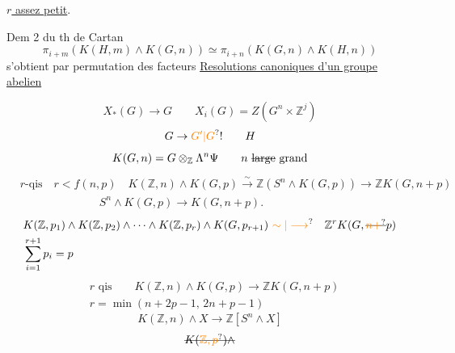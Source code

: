 \uline{$r$ assez petit}.

Dem 2 du th de Cartan
\[
\pi_{i+m}(K(H,m)\wedge K(G,n))\simeq\pi_{i+n}(K(G,n)\wedge K(H,n))
\]
s'obtient par permutation des facteurs
\uline{Resolutions canoniques d'un groupe abelien}

\[
X_*(G)\longrightarrow G\qquad X_i(G)=Z(G^n\times\mathbb Z^j)
\]
\[
G\to \unsure{G'|G}!\qquad H
\]
\[
K(G,n)=G\otimes_{\mathbb Z}\Lambda^n\Psi\qquad n\ \deleted{\text{large}}\ \text{grand}
\]
\[
\begin{aligned}
&r\text{-qis}\quad r<f(n,p)\quad K(\mathbb Z,n)\wedge K(G,p)\xrightarrow{\sim}\mathbb Z(S^n\wedge K(G,p))\longrightarrow\mathbb Z K(G,n+p)\\
&\hspace{7em} S^n\wedge K(G,p)\longrightarrow K(G,n+p).
\end{aligned}
\]
\[
\begin{aligned}
&K(\mathbb Z,p_1)\wedge K(\mathbb Z,p_2)\wedge\cdots\wedge K(\mathbb Z,p_r)\wedge K(G,p_{r+1})\ \unsure{\sim|\longrightarrow}\quad\mathbb Z^r K(G,\deleted{\unsure{n+}}p)\\
&\sum_{i=1}^{r+1}p_i=p
\end{aligned}
\]
\[
\begin{aligned}
&r\text{ qis}\qquad \boxed{K(\mathbb Z,n)\wedge K(G,p)\longrightarrow\mathbb Z K(G,n+p)}\\
&r=\min(n+2p-1,\,2n+p-1)
\end{aligned}
\]
\[
K(\mathbb Z,n)\wedge X\longrightarrow\mathbb Z[S^n\wedge X]
\]
\[
\deleted{K(\unsure{\mathbb Z,p})\wedge}
\]
